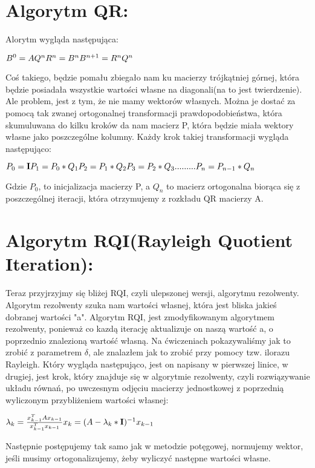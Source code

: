 \documentclass[12pt]{article}
\begin{document}
\section{Algorytm QR:}
Alorytm wygląda następująca:
\begin{center}
    \begin{math}
        B^{0} = A \newline
        Q^{n}R^{n} = B^{n}
        B^{n+1} = R^{n}Q^{n}
    \end{math}
\end{center}
Coś takiego, będzie pomału zbiegało nam ku macierzy trójkątniej górnej, która będzie posiadała wszystkie wartości własne na diagonali(na to jest twierdzenie). Ale problem, jest z tym, że nie mamy wektorów własnych. Można je dostać za pomocą tak zwanej ortogonalnej transformacji prawdopodobieństwa, która skumuluwana do kilku kroków da nam macierz P, która będzie miała wektory własne jako poszczególne kolumny. Każdy krok takiej transformacji wygląda następująco:
\begin{center}
    \begin{math}
        P_{0} = \mathbf{I} \newline
        P_{1} = P_{0}*Q_{1} \newline
        P_{2} = P_{1}*Q_{2} \newline
        P_{3} = P_{2}*Q_{3} \newline
        .........\newline
        P_{n} = P_{n-1}*Q_{n}
    \end{math}
\end{center}
Gdzie $P_{0}$, to inicjalizacja macierzy P, a $Q_{n}$ to macierz ortogonalna biorąca się z poszczególnej iteracji, która otrzymujemy z rozkładu QR macierzy A.
\section{Algorytm RQI(Rayleigh Quotient Iteration):} 
Teraz przyjrzyjmy się bliżej RQI, czyli ulepszonej wersji, algorytmu rezolwenty. Algorytm rezolwenty szuka nam wartości własnej, która jest bliska jakieś dobranej wartości "a". Algorytm RQI, jest zmodyfikowanym algorytmem rezolwenty, ponieważ co kazdą iterację aktualizuje on naszą wartość a, o poprzednio znalezioną wartość własną. Na ćwiczeniach pokazywaliśmy jak to zrobić z parametrem $\delta$, ale znalazłem jak to zrobić przy pomocy tzw. ilorazu Rayleigh. Który wygląda następująco, jest on napisany w pierwszej linice, w drugiej, jest krok, który znajduje się w algorytmie rezolwenty, czyli rozwiązywanie układu równań, po uwczesnym odjęciu macierzy jednostkowej z poprzednią wyliczonym przybliżeniem wartości własnej:
\begin{center}
    \begin{math}
        \lambda_{k} = \frac{x_{k-1}^{T}Ax_{k-1}}{x_{k-1}^{T}x_{k-1}} \newline
        x_{k} = (A-\lambda_{k}*\mathbf{I})^{-1}x_{k-1} 
    \end{math}
\end{center}
Następnie postępujemy tak samo jak w metodzie potęgowej, normujemy wektor, jeśli musimy ortogonalizujemy, żeby wyliczyć następne wartości własne.
\end{document}
